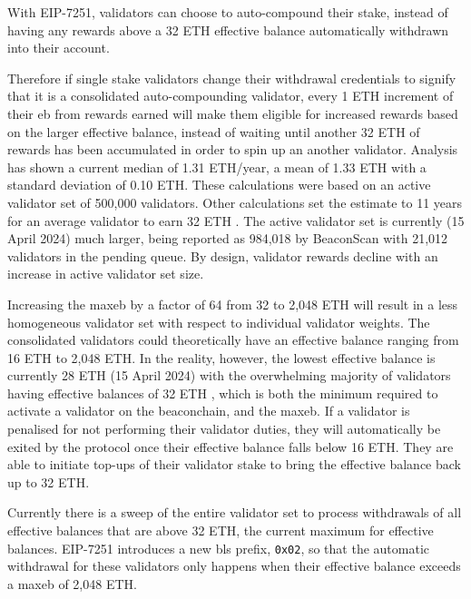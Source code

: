 \documentclass[submission,copyright,creativecommons]{eptcs}
\begin{document}
With EIP-7251, validators can choose to auto-compound their stake, instead of
having any rewards above a 32 ETH effective balance automatically withdrawn
into their account.

Therefore if single stake validators change their withdrawal credentials to signify that it is a consolidated auto-compounding validator, every 1 ETH increment of their \gls{eb} from rewards earned will make them eligible for increased rewards based on the larger effective balance, instead of waiting until another 32 ETH of rewards has been accumulated in order to spin up an another validator. Analysis \cite{Edgington2023} has shown a current median of 1.31 ETH/year, a mean of 1.33 ETH with a standard deviation of 0.10 ETH. These calculations were based on an active validator set of 500,000 validators. Other calculations set the estimate to 11 years for an average validator
    to earn 32 ETH
    \cite{Neuder2023a}. The active validator set is currently (15 April 2024) much larger,  being reported as 984,018 by BeaconScan \cite{etherscan} with 21,012 validators in the pending queue. By design, validator rewards decline with an increase in active validator set size.

Increasing the \gls{maxeb} by a factor of 64 from 32 to 2,048 ETH
will result in a less homogeneous validator set with respect to individual
validator weights. The consolidated validators could theoretically have an effective balance ranging from 16 ETH to 2,048 ETH. In the reality, however, the lowest effective balance is currently 28 ETH (15 April 2024) with the overwhelming majority of validators having effective balances of 32 ETH \cite{etherscan}, which is both the minimum required to activate a validator on the beaconchain, and the \gls{maxeb}. If a validator is penalised for not performing their validator duties, they will automatically be exited by the protocol once their effective balance falls below 16 ETH. They are able to initiate top-ups of their validator stake to bring the effective balance back up to 32 ETH.

Currently there is a sweep of the entire validator set to process withdrawals
of all effective balances that are above 32 ETH, the current maximum for
effective balances. EIP-7251 introduces a new \gls{bls} prefix, \texttt{0x02}, so that the
automatic withdrawal for these validators only happens when their effective
balance exceeds a \gls{maxeb} of 2,048 ETH. 
\end{document}
